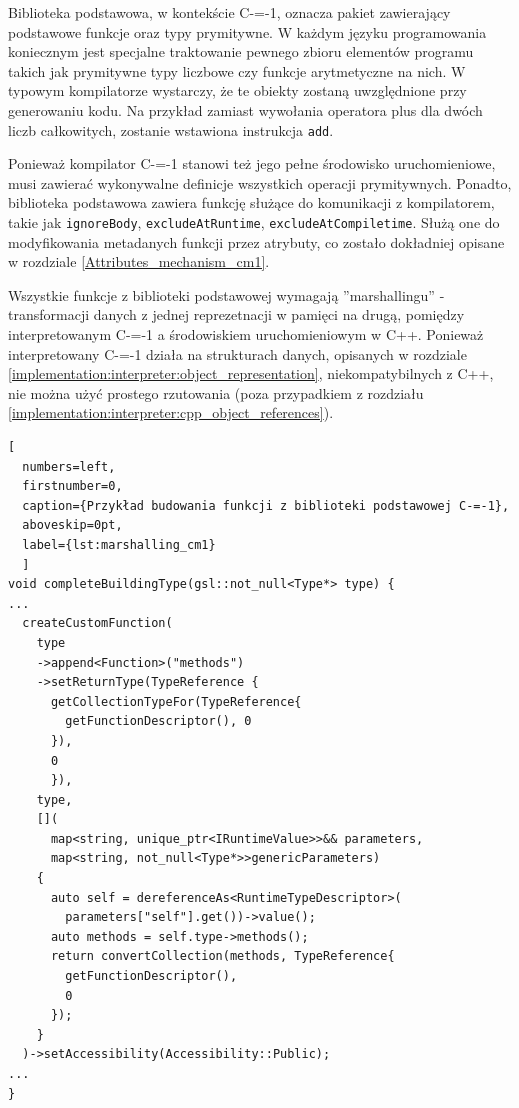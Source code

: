 Biblioteka podstawowa, w kontekście C-=-1, oznacza pakiet zawierający podstawowe funkcje oraz typy prymitywne.
W każdym języku programowania koniecznym jest specjalne traktowanie pewnego zbioru elementów programu takich jak prymitywne typy liczbowe czy funkcje arytmetyczne na nich.
W typowym kompilatorze wystarczy, że te obiekty zostaną uwzględnione przy generowaniu kodu.
Na przykład zamiast wywołania operatora plus dla dwóch liczb całkowitych, zostanie wstawiona instrukcja \lstinline{add}.

Ponieważ kompilator C-=-1 stanowi też jego pełne środowisko uruchomieniowe, musi zawierać wykonywalne definicje wszystkich operacji prymitywnych.
Ponadto, biblioteka podstawowa zawiera funkcję służące do komunikacji z kompilatorem, takie jak \lstinline{ignoreBody}, \lstinline{excludeAtRuntime}, \lstinline{excludeAtCompiletime}.
Służą one do modyfikowania metadanych funkcji przez atrybuty, co zostało dokładniej opisane w rozdziale \ref{Attributes_mechanism_cm1}.

Wszystkie funkcje z biblioteki podstawowej wymagają ''marshallingu'' - transformacji danych z jednej reprezetnacji w pamięci na drugą, pomiędzy interpretowanym C-=-1 a środowiskiem uruchomieniowym w C++.
Ponieważ interpretowany C-=-1 działa na strukturach danych, opisanych w rozdziale \ref{implementation:interpreter:object_representation}, niekompatybilnych z C++, nie można użyć prostego rzutowania (poza przypadkiem z rozdziału \ref{implementation:interpreter:cpp_object_references}).

\begin{minipage}{\linewidth}
\begin{lstlisting}[
  numbers=left,
  firstnumber=0,
  caption={Przykład budowania funkcji z biblioteki podstawowej C-=-1},
  aboveskip=0pt,
  label={lst:marshalling_cm1}
  ]
void completeBuildingType(gsl::not_null<Type*> type) {
...
  createCustomFunction(
    type
    ->append<Function>("methods")
    ->setReturnType(TypeReference {
      getCollectionTypeFor(TypeReference{
        getFunctionDescriptor(), 0 
      }),
      0 
      }),
    type,
    [](
      map<string, unique_ptr<IRuntimeValue>>&& parameters,
      map<string, not_null<Type*>>genericParameters)
    {
      auto self = dereferenceAs<RuntimeTypeDescriptor>(
        parameters["self"].get())->value();
      auto methods = self.type->methods();
      return convertCollection(methods, TypeReference{
        getFunctionDescriptor(),
        0
      });
    }
  )->setAccessibility(Accessibility::Public);
...
}
\end{lstlisting}
\end{minipage}

